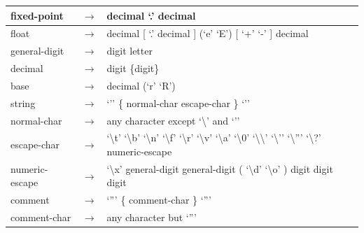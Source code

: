\documentclass[letterpaper,10pt,english]{sphinxmanual}
\begin{document}
\begin{tabulary}{\linewidth}{|L|L|L|}
fixed-point
 & 
\(\rightarrow\)
 & 
decimal ‘.’ decimal
\\\hline

float
 & 
\(\rightarrow\)
 & 
decimal {[} ‘.’ decimal {]} (‘e’ \textbar{} ‘E’) {[} ‘+’ \textbar{} ‘-’ {]} decimal
\\\hline

general-digit
 & 
\(\rightarrow\)
 & 
digit \textbar{} letter
\\\hline

decimal
 & 
\(\rightarrow\)
 & 
digit \{digit\}
\\\hline

base
 & 
\(\rightarrow\)
 & 
decimal (‘r’ \textbar{} ‘R’)
\\\hline

string
 & 
\(\rightarrow\)
 & 
‘’’ \{ normal-char \textbar{} escape-char \} ‘’’
\\\hline

normal-char
 & 
\(\rightarrow\)
 & 
any character except ‘\textbackslash{}’ and ‘’’
\\\hline

escape-char
 & 
\(\rightarrow\)
 & 
‘\textbackslash{}t’ \textbar{} ‘\textbackslash{}b’ \textbar{} ‘\textbackslash{}n’ \textbar{} ‘\textbackslash{}f’ \textbar{} ‘\textbackslash{}r’ \textbar{} ‘\textbackslash{}v’ \textbar{} ‘\textbackslash{}a’ \textbar{} ‘\textbackslash{}0’ \textbar{} ‘\textbackslash{}\textbackslash{}’ \textbar{} ‘\textbackslash{}’’ \textbar{} ‘\textbackslash{}''’ \textbar{} ‘\textbackslash{}?’ \textbar{} numeric-escape
\\\hline

numeric-escape
 & 
\(\rightarrow\)
 & 
‘\textbackslash{}x’ general-digit general-digit \textbar{} ( ‘\textbackslash{}d’ \textbar{} ‘\textbackslash{}o’ ) digit digit digit
\\\hline

comment
 & 
\(\rightarrow\)
 & 
‘''’ \{ comment-char \} ‘''’
\\\hline

comment-char
 & 
\(\rightarrow\)
 & 
any character but ‘''’
\\\hline
\end{tabulary}
\end{document}
